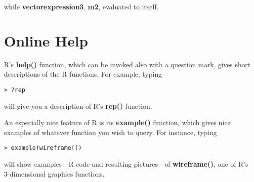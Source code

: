 while {\bf vectorexpression3}, {\bf m2}, evaluated to itself.

\section{Online Help} 

R's {\bf help()} function, which can be invoked also with a
question mark, gives short descriptions of the R functions. For
example, typing

\begin{Verbatim}[fontsize=\relsize{-2}]
> ?rep
\end{Verbatim}
  
will give you a description of R's {\bf rep()} function.

An especially nice feature of R is its {\bf example()} function, which
gives nice examples of whatever function you wish to query. For
instance, typing

\begin{lstlisting}
> example(wireframe())
\end{lstlisting}
  
will show examples---R code and resulting pictures---of {\bf wireframe()},
one of R's 3-dimensional graphics functions.
